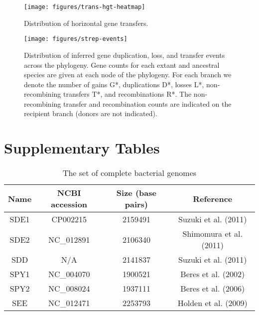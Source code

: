 \documentclass[english]{article}
\providecommand{\tabularnewline}{\\}
\begin{document}
\begin{figure}
\begin{center}
\texttt{[image: figures/trans-hgt-heatmap]}
\end{center}
\vspace{-1.2in}
\caption{Distribution of horizontal gene transfers.}
\label{fig:hgt-heatmap}
\end{figure}

\begin{figure}
\texttt{[image: figures/strep-events]}
\caption{\label{fig:Gene-duplication-loss} Distribution of inferred
  gene duplication, loss, and transfer events across the phylogeny.
  Gene counts for each extant and ancestral species are given at each
  node of the phylogeny.  For each branch we denote the number of gains
  G*, duplications D*, losses L*, non-recombining transfers T*, and 
  recombinations R*.  The non-recombining transfer and recombination counts
  are indicated on the recipient branch (donors are not indicated).}
\end{figure}
\clearpage{}%


\clearpage{}\setcounter{figure}{0}
\setcounter{table}{0}
\renewcommand{\figurename}{Supplementary Figure}
\renewcommand{\tablename}{Supplementary Table}

\section*{Supplementary Tables}
\clearpage{}

\begin{table}
\caption{\label{tab:genome}The set of complete bacterial genomes}
\noindent \begin{centering}
\begin{tabular}{cccc}
\hline 
Name & NCBI accession & Size (base pairs) & Reference\tabularnewline
\hline
SDE1 & CP002215 & 2159491 & Suzuki et al. (2011)\tabularnewline
SDE2 & NC\_012891 & 2106340 & Shimomura et al. (2011)\tabularnewline
SDD & N/A & 2141837 & Suzuki et al. (2011)\tabularnewline
SPY1 & NC\_004070 & 1900521 & Beres et al. (2002)\tabularnewline
SPY2 & NC\_008024 & 1937111 & Beres et al. (2006)\tabularnewline
SEE & NC\_012471 & 2253793 & Holden et al. (2009)\tabularnewline
\hline
\end{tabular}
\par\end{centering}
\end{table}
\clearpage{}
\end{document}
